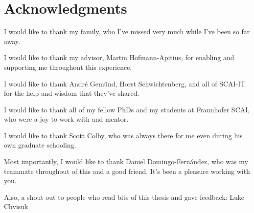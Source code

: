 \chapter*{Acknowledgments}

I would like to thank my family, who I've missed very much while I've been so far away.

I would like to thank my advisor, Martin Hofmann-Apitius, for enabling and supporting me throughout this experience.

I would like to thank André Gemünd, Horst Schwichtenberg, and all of SCAI-IT for the help and wisdom that they've shared.

I would like to thank all of my fellow PhDs and my students at Fraunhofer SCAI, who were a joy to work with and mentor.

I would like to thank Scott Colby, who was always there for me even during his own graduate schooling.

Most importantly, I would like to thank Daniel Domingo-Fern\'{a}ndez, who was my teammate throughout of this and a good friend.
It's been a pleasure working with you.

\vspace*{\fill}

Also, a shout out to people who read bits of this thesis and gave feedback: Luke Chvisuk
